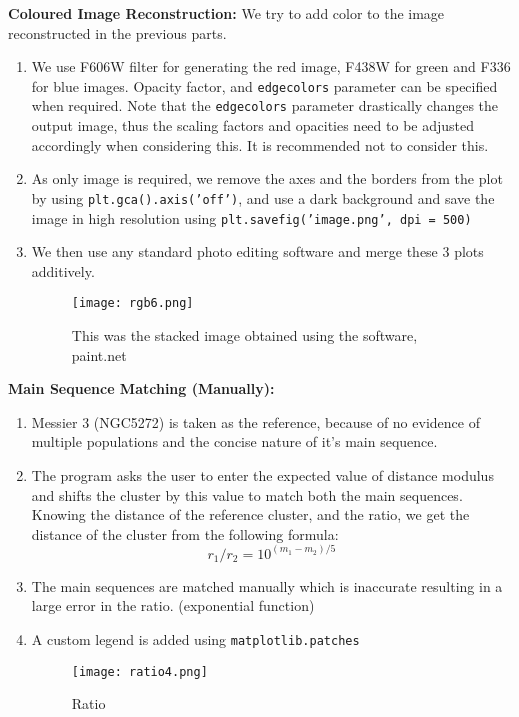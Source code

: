 \documentclass{article}
\begin{document}
\textbf{\Large Coloured Image Reconstruction:\newline }
We try to add color to the image reconstructed in the previous parts.
 \begin{enumerate}
     \item We use F606W filter for generating the red image, F438W for green and F336 for blue images. Opacity factor, and \texttt{edgecolors} parameter can be specified when required.\newline
     Note that the \texttt{edgecolors} parameter drastically changes the output image, thus the scaling factors and opacities need to be adjusted accordingly when considering this.\newline
     It is recommended not to consider this.
     \item As only image is required, we remove the axes and the borders from the plot by using \texttt{plt.gca().axis('off')}, and use a dark background and save the image in high resolution using \texttt{plt.savefig('image.png', dpi = 500)}
     \item We then use any standard photo editing software and merge these 3 plots additively. 
     \begin{figure}[H]
    \caption{This was the stacked image obtained using the software, paint.net}
    \centering
    \texttt{[image: rgb6.png]}
    \end{figure}\newpage
 \end{enumerate}
 \textbf{\Large Main Sequence Matching (Manually): }
\begin{enumerate}
    \item Messier 3 (NGC5272) is taken as the reference, because of no evidence of multiple populations and the concise nature of it's main sequence.
    \item The program asks the user to enter the expected value of distance modulus and shifts the cluster by this value to match both the main sequences. Knowing the distance of the reference cluster, and the ratio, we get the distance of the cluster from the following formula:
    $$r_1 / r_2 = 10 ^ {(m_1 - m_2)/5}$$
    \item The main sequences are matched manually which is inaccurate resulting in a large error in the ratio. (exponential function)
    \item A custom legend is added using \texttt{matplotlib.patches}
    \begin{figure}[H]
    \caption{Ratio}
    \centering
    \texttt{[image: ratio4.png]}
    \end{figure}\newpage
\end{enumerate}
\end{document}
